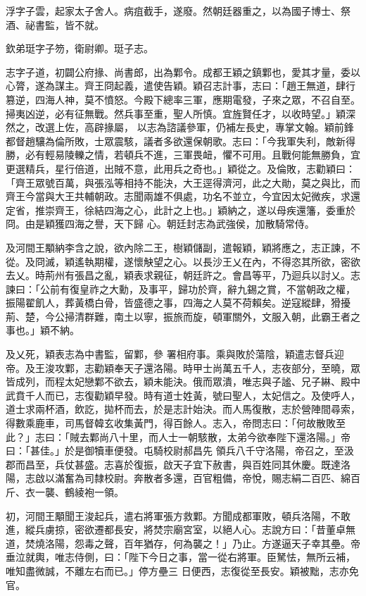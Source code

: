 \begin{pinyinscope}
 浮字子雲，起家太子舍人。病疽截手，遂廢。然朝廷器重之，以為國子博士、祭酒、祕書監，皆不就。



 欽弟珽字子笏，衛尉卿。珽子志。



 志字子道，初闢公府掾、尚書郎，出為鄴令。成都王穎之鎮鄴也，愛其才量，委以心膂，遂為謀主。齊王冏起義，遣使告穎。穎召志計事，志曰：「趙王無道，肆行篡逆，四海人神，莫不憤怒。今殿下總率三軍，應期電發，子來之眾，不召自至。掃夷凶逆，必有征無戰。然兵事至重，聖人所慎。宜旌賢任才，以收時望。」穎深然之，改選上佐，高辟掾屬，
 以志為諮議參軍，仍補左長史，專掌文翰。穎前鋒都督趙驤為倫所敗，士眾震駭，議者多欲還保朝歌。志曰：「今我軍失利，敵新得勝，必有輕易陵轢之情，若頓兵不進，三軍畏衄，懼不可用。且戰何能無勝負，宜更選精兵，星行倍道，出賊不意，此用兵之奇也。」穎從之。及倫敗，志勸穎曰：「齊王眾號百萬，與張泓等相持不能決，大王逕得濟河，此之大勛，莫之與比，而齊王今當與大王共輔朝政。志聞兩雄不俱處，功名不並立，今宜因太妃微疾，求還定省，推崇齊王，徐結四海之心，此計之上也。」穎納之，遂以母疾還籓，委重於冏。由是穎獲四海之譽，天下歸
 心。朝廷封志為武強侯，加散騎常侍。



 及河間王顒納李含之說，欲內除二王，樹穎儲副，遣報穎，穎將應之，志正諫，不從。及冏滅，穎遙執期權，遂懷觖望之心。以長沙王乂在內，不得恣其所欲，密欲去乂。時荊州有張昌之亂，穎表求親征，朝廷許之。會昌等平，乃迴兵以討乂。志諫曰：「公前有復皇祚之大勳，及事平，歸功於齊，辭九錫之賞，不當朝政之權，振陽翟飢人，葬黃橋白骨，皆盛德之事，四海之人莫不荷賴矣。逆寇縱肆，猾擾荊、楚，今公掃清群難，南土以寧，振旅而旋，頓軍關外，文服入朝，此霸王者之事也。」穎不納。



 及乂死，穎表志為中書監，留鄴，參
 署相府事。乘與敗於蕩陰，穎遣志督兵迎帝。及王浚攻鄴，志勸穎奉天子還洛陽。時甲士尚萬五千人，志夜部分，至曉，眾皆成列，而程太妃戀鄴不欲去，穎未能決。俄而眾潰，唯志與子謐、兄子綝、殿中武賁千人而已，志復勸穎早發。時有道士姓黃，號曰聖人，太妃信之。及使呼人，道士求兩杯酒，飲訖，拋杯而去，於是志計始決。而人馬復散，志於營陣間尋索，得數乘鹿車，司馬督韓玄收集黃門，得百餘人。志入，帝問志曰：「何故散敗至此？」志曰：「賊去鄴尚八十里，而人士一朝駭散，太弟今欲奉陛下還洛陽。」帝曰：「甚佳。」於是御犢車便發。屯騎校尉郝昌先
 領兵八千守洛陽，帝召之，至汲郡而昌至，兵仗甚盛。志喜於復振，啟天子宜下赦書，與百姓同其休慶。既達洛陽，志啟以滿奮為司隸校尉。奔散者多還，百官粗備，帝悅，賜志絹二百匹、綿百斤、衣一襲、鶴綾袍一領。



 初，河間王顒聞王浚起兵，遣右將軍張方救鄴。方聞成都軍敗，頓兵洛陽，不敢進，縱兵虜掠，密欲遷都長安，將焚宗廟宮室，以絕人心。志說方曰：「昔董卓無道，焚燒洛陽，怨毒之聲，百年猶存，何為襲之！」乃止。方遂逼天子幸其壘。帝垂泣就輿，唯志侍側，曰：「陛下今日之事，當一從右將軍。臣駑怯，無所云補，唯知盡微誠，不離左右而已。」停方壘三
 日便西，志復從至長安。穎被黜，志亦免官。




\end{pinyinscope}
